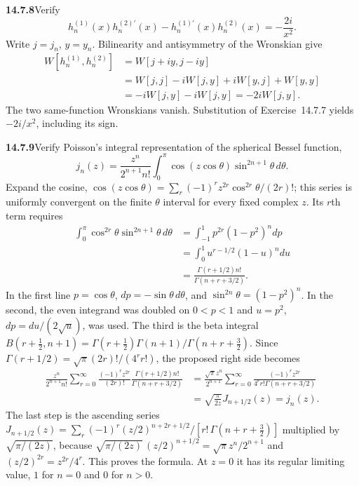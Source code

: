 \par\bigskip
\noindent\textbf{14.7.8}\quad Verify
\[
h_{n}^{(1)}(x)h_{n}^{(2)\prime}(x)-h_{n}^{(1)\prime}(x)h_{n}^{(2)}(x)
=-\frac{2i}{x^{2}}.
\]
\solution
Write $j=j_n$, $y=y_n$. Bilinearity and antisymmetry
of the Wronskian give
\begin{align*}
W[h_n^{(1)},h_n^{(2)}]
&=W[j+iy,j-iy]\\
&=W[j,j]-iW[j,y]+iW[y,j]+W[y,y]\\
&=-iW[j,y]-iW[j,y]=-2iW[j,y].
\end{align*}
The two same-function Wronskians vanish. Substitution of
Exercise~14.7.7 yields $\boxed{-2i/x^2}$, including its sign.

\par\bigskip
\noindent\textbf{14.7.9}\quad Verify Poisson's integral representation
of the spherical Bessel function,
\[
j_{n}(z)=\frac{z^{n}}{2^{n+1}n!}\int_{0}^{\pi}\cos(z\cos\theta)
\sin^{2n+1}\theta\,d\theta.
\]
\solution
Expand the cosine,
$\cos(z\cos\theta)=\sum_r(-1)^rz^{2r}\cos^{2r}\theta/(2r)!$; this
series is uniformly convergent
on the finite $\theta$ interval for every fixed complex $z$.
Its $r$th term requires
\begin{align*}
\int_0^\pi\cos^{2r}\theta\sin^{2n+1}\theta\,d\theta
&=\int_{-1}^1p^{2r}(1-p^2)^n dp\\
&=\int_0^1u^{r-1/2}(1-u)^n du\\
&=\frac{\Gamma(r+1/2)n!}{\Gamma(n+r+3/2)}.
\end{align*}
In the first line $p=\cos\theta$, $dp=-\sin\theta\,d\theta$, and
$\sin^{2n}\theta=(1-p^2)^n$. In the second, the even integrand was
doubled on $0<p<1$ and $u=p^2$, $dp=du/(2\sqrt u)$, was used. The
third is the beta integral
$B(r+\frac12,n+1)=\Gamma(r+\frac12)\Gamma(n+1)/\Gamma(n+r+\frac32)$.
Since
$\Gamma(r+1/2)=\sqrt\pi(2r)!/(4^rr!)$, the proposed right side
becomes
\begin{align*}
\frac{z^n}{2^{n+1}n!}
\sum_{r=0}^\infty\frac{(-1)^rz^{2r}}{(2r)!}
\frac{\Gamma(r+1/2)n!}{\Gamma(n+r+3/2)}
&=\frac{\sqrt\pi z^n}{2^{n+1}}
\sum_{r=0}^\infty\frac{(-1)^rz^{2r}}{4^rr!\Gamma(n+r+3/2)}\\
&=\sqrt{\frac\pi{2z}}J_{n+1/2}(z)=j_n(z).
\end{align*}
The last step is the ascending series
$J_{n+1/2}(z)=\sum_r(-1)^r(z/2)^{n+2r+1/2}/[r!\,\Gamma(n+r+\frac32)]$
multiplied by $\sqrt{\pi/(2z)}$, because
$\sqrt{\pi/(2z)}\,(z/2)^{n+1/2}=\sqrt\pi z^n/2^{n+1}$ and
$(z/2)^{2r}=z^{2r}/4^r$. This proves the formula. At $z=0$ it has
its regular limiting value, $1$ for $n=0$ and $0$ for $n>0$.

